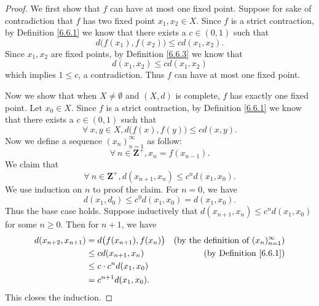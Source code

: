 \begin{proof}
    We first show that \(f\) can have at most one fixed point.
    Suppose for sake of contradiction that \(f\) has two fixed point \(x_1, x_2 \in X\).
    Since \(f\) is a strict contraction, by Definition \ref{6.6.1} we know that there exists a \(c \in (0, 1)\) such that
    \[
        d\big(f(x_1), f(x_2)\big) \leq c d(x_1, x_2).
    \]
    Since \(x_1, x_2\) are fixed points, by Definition \ref{6.6.3} we know that
    \[
        d(x_1, x_2) \leq c d(x_1, x_2)
    \]
    which implies \(1 \leq c\), a contradiction.
    Thus \(f\) can have at most one fixed point.

    Now we show that when \(X \neq \emptyset\) and \((X, d)\) is complete, \(f\) has exactly one fixed point.
    Let \(x_0 \in X\).
    Since \(f\) is a strict contraction, by Definition \ref{6.6.1} we know that there exists a \(c \in (0, 1)\) such that
    \[
        \forall\ x, y \in X, d\big(f(x), f(y)\big) \leq c d(x, y).
    \]
    Now we define a sequence \((x_n)_{n = 1}^\infty\) as follow:
    \[
        \forall\ n \in \mathbf{Z}^+, x_n = f(x_{n - 1}).
    \]
    We claim that
    \[
        \forall\ n \in \mathbf{Z}^+, d(x_{n + 1}, x_n) \leq c^n d(x_1, x_0).
    \]
    We use induction on \(n\) to proof the claim.
    For \(n = 0\), we have
    \[
        d(x_1, d_0) \leq c^0 d(x_1, x_0) = d(x_1, x_0).
    \]
    Thus the base case holds.
    Suppose inductively that \(d(x_{n + 1}, x_n) \leq c^n d(x_1, x_0)\) for some \(n \geq 0\).
    Then for \(n + 1\), we have
    \begin{align*}
        d(x_{n + 2}, x_{n + 1}) & = d\big(f(x_{n + 1}), f(x_n)\big) & \text{(by the definition of \((x_n)_{n = 1}^\infty\))} \\
                                & \leq c d(x_{n + 1}, x_n)          & \text{(by Definition \ref{6.6.1})}                     \\
                                & \leq c \cdot c^n d(x_1, x_0)                                                               \\
                                & = c^{n + 1} d(x_1, x_0).
    \end{align*}
    This closes the induction.


\end{proof}
